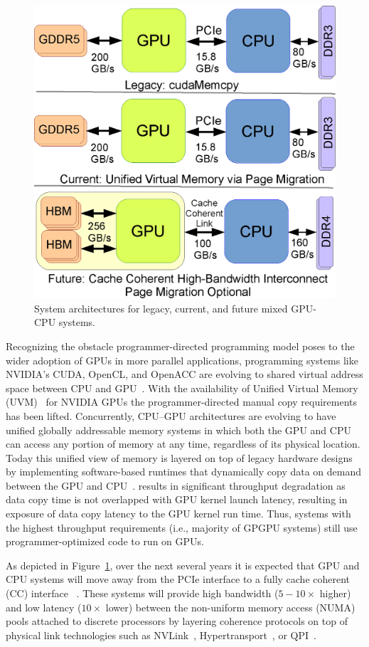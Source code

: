 \begin{figure}[t]
    \centering
    \includegraphics[width=0.7\columnwidth]{hpca2015/figures/architecture.eps}
    \caption{System architectures for legacy, current, and future mixed GPU-CPU systems.}
    \label{fig:arch-hpca2015}
\end{figure}

Recognizing the obstacle programmer-directed programming model poses to the
wider adoption of GPUs in more parallel applications, programming systems like
NVIDIA's CUDA, OpenCL, and OpenACC are evolving to shared virtual address space
between CPU and GPU~\cite{UVM}. With the availability of Unified Virtual Memory
(UVM)~\cite{UVM} for NVIDIA GPUs the programmer-directed manual copy
requirements has been lifted.  Concurrently, CPU--GPU architectures are evolving
to have unified globally addressable memory systems in which both the GPU and
CPU can access any portion of memory at any time, regardless of its physical
location.  Today this unified view of memory is layered on top of legacy
hardware designs by implementing software-based runtimes that dynamically copy
data on demand between the GPU and CPU~\cite{cuda}.  results in significant
throughput degradation as data copy time is not overlapped with GPU kernel
launch latency, resulting in exposure of data copy latency to the GPU kernel run
time. Thus, systems with the highest throughput requirements (i.e., majority of
GPGPU systems) still use programmer-optimized code to run on GPUs.

As depicted in Figure~\ref{fig:arch-hpca2015}, over the next several years it is
expected that GPU and CPU systems will move away from the PCIe interface to a
fully cache coherent (CC) interface ~\cite{AMDHSA}. These systems will provide
high bandwidth ($5-10\times$ higher) and low latency ($10\times$ lower) between
the non-uniform memory access (NUMA) pools attached to discrete processors by
layering coherence protocols on top of physical link technologies such as
NVLink~\cite{NVLINK}, Hypertransport~\cite{AMDHT}, or QPI~\cite{INTELQPI}.


